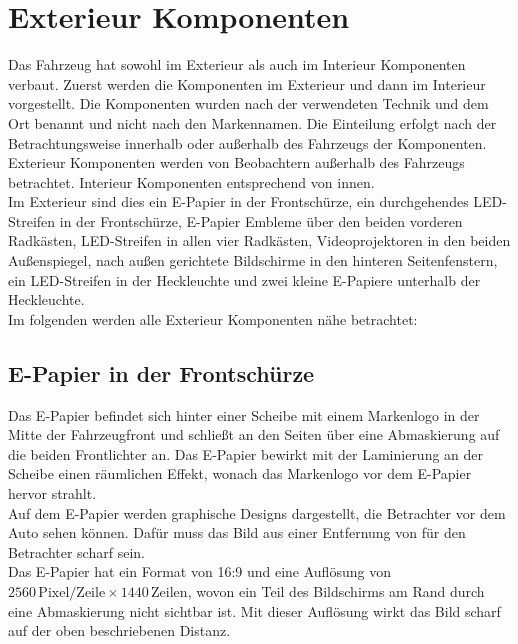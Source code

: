 \section{Exterieur Komponenten}
Das Fahrzeug hat sowohl im Exterieur als auch im Interieur Komponenten verbaut. Zuerst werden die Komponenten im Exterieur und dann im Interieur vorgestellt. Die Komponenten wurden nach der verwendeten Technik und dem Ort benannt und nicht nach den Markennamen. Die Einteilung erfolgt nach der Betrachtungsweise innerhalb oder außerhalb des Fahrzeugs der Komponenten. Exterieur Komponenten werden von Beobachtern außerhalb des Fahrzeugs betrachtet. Interieur Komponenten entsprechend von innen.\\
Im Exterieur sind dies ein E-Papier in der Frontschürze, ein durchgehendes LED-Streifen in der Frontschürze, E-Papier Embleme über den beiden vorderen Radkästen, LED-Streifen in allen vier Radkästen, Videoprojektoren in den beiden Außenspiegel, nach außen gerichtete Bildschirme in den hinteren Seitenfenstern, ein LED-Streifen in der Heckleuchte und zwei kleine E-Papiere unterhalb der Heckleuchte.\\
Im folgenden werden alle Exterieur Komponenten nähe betrachtet:
\subsection{E-Papier in der Frontschürze}
Das E-Papier befindet sich hinter einer Scheibe mit einem Markenlogo in der Mitte der Fahrzeugfront und schließt an den Seiten über eine Abmaskierung auf die beiden Frontlichter an. Das E-Papier bewirkt mit der Laminierung an der Scheibe einen räumlichen Effekt, wonach das Markenlogo vor dem E-Papier hervor strahlt. \\
Auf dem E-Papier werden graphische Designs dargestellt, die Betrachter vor dem Auto sehen können. Dafür muss das Bild aus einer Entfernung von  für den Betrachter scharf sein. \\
Das E-Papier hat ein Format von 16:9 und eine Auflösung von  $ 2560\,\mathrm{Pixel}/\mathrm{Zeile} \times 1440\,\mathrm{Zeilen} $, wovon ein Teil des Bildschirms am Rand durch eine Abmaskierung nicht sichtbar ist. Mit dieser Auflösung wirkt das Bild scharf auf der oben beschriebenen Distanz.
